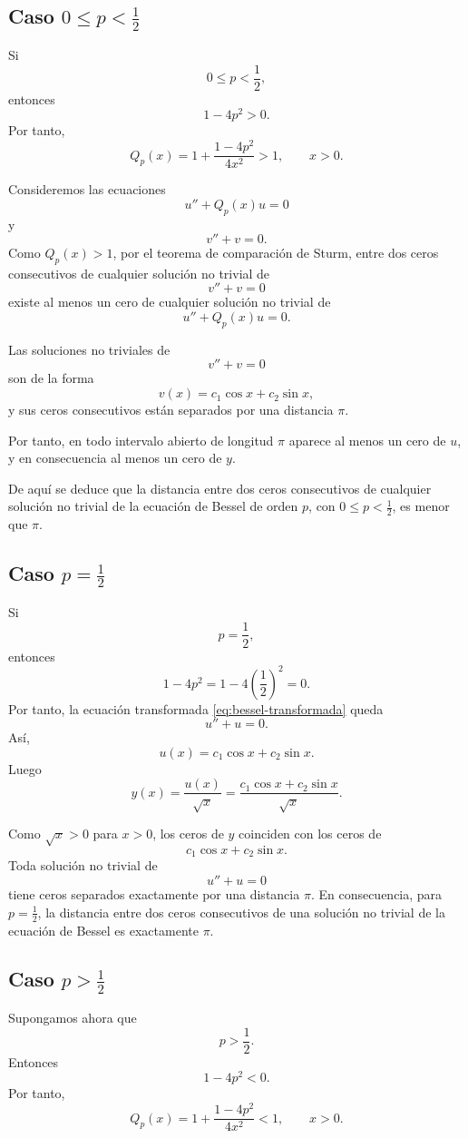 \documentclass[12pt,a4paper]{article}
\theoremstyle{definition}
\begin{document}
\subsection{Caso \(0\leq p<\frac12\)}

Si
\[
0\leq p<\frac12,
\]
entonces
\[
1-4p^2>0.
\]
Por tanto,
\[
Q_p(x)=1+\frac{1-4p^2}{4x^2}>1,
\qquad x>0.
\]

Consideremos las ecuaciones
\[
u''+Q_p(x)u=0
\]
y
\[
v''+v=0.
\]
Como \(Q_p(x)>1\), por el teorema de comparación de Sturm, entre dos ceros consecutivos de cualquier solución no trivial de
\[
v''+v=0
\]
existe al menos un cero de cualquier solución no trivial de
\[
u''+Q_p(x)u=0.
\]

Las soluciones no triviales de
\[
v''+v=0
\]
son de la forma
\[
v(x)=c_1\cos x+c_2\sin x,
\]
y sus ceros consecutivos están separados por una distancia \(\pi\).

Por tanto, en todo intervalo abierto de longitud \(\pi\) aparece al menos un cero de \(u\), y en consecuencia al menos un cero de \(y\).

De aquí se deduce que la distancia entre dos ceros consecutivos de cualquier solución no trivial de la ecuación de Bessel de orden \(p\), con \(0\leq p<\frac12\), es menor que \(\pi\).

\subsection{Caso \(p=\frac12\)}

Si
\[
p=\frac12,
\]
entonces
\[
1-4p^2=1-4\left(\frac12\right)^2=0.
\]
Por tanto, la ecuación transformada \eqref{eq:bessel-transformada} queda
\[
u''+u=0.
\]
Así,
\[
u(x)=c_1\cos x+c_2\sin x.
\]
Luego
\[
y(x)=\frac{u(x)}{\sqrt{x}}
=
\frac{c_1\cos x+c_2\sin x}{\sqrt{x}}.
\]

Como \(\sqrt{x}>0\) para \(x>0\), los ceros de \(y\) coinciden con los ceros de
\[
c_1\cos x+c_2\sin x.
\]
Toda solución no trivial de
\[
u''+u=0
\]
tiene ceros separados exactamente por una distancia \(\pi\). En consecuencia, para \(p=\frac12\), la distancia entre dos ceros consecutivos de una solución no trivial de la ecuación de Bessel es exactamente \(\pi\).

\subsection{Caso \(p>\frac12\)}

Supongamos ahora que
\[
p>\frac12.
\]
Entonces
\[
1-4p^2<0.
\]
Por tanto,
\[
Q_p(x)=1+\frac{1-4p^2}{4x^2}<1,
\qquad x>0.
\]
\end{document}
